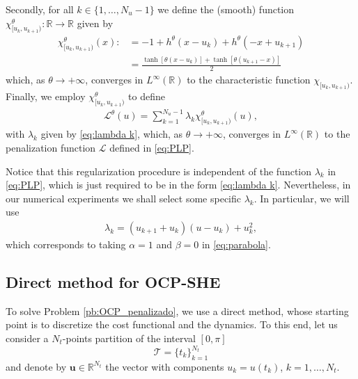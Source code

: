\documentclass[9pt,shortpaper,twoside,web]{ieeecolor}
\begin{document}
Secondly, for all $k \in \{1,\dots,N_u-1\}$ we define the (smooth) function $\chi_{[u_k,u_{k+1})}^\theta:\mathbb{R} \rightarrow \mathbb{R}$ given by
\begin{align*}
	\chi_{[u_k,u_{k+1})}^\theta(x) :&= - 1 + h^\theta(x-u_k) + h^\theta(-x+u_{k+1}) 
	\\[5pt]
	&= \frac{\tanh[\theta(x-u_k)] + \tanh[\theta (u_{k+1}-x)]}{2}
\end{align*}
which, as $\theta\to +\infty$, converges in $L^\infty(\mathbb{R})$ to the characteristic function $\chi_{[u_k,u_{k+1})}$. Finally, we employ $\chi_{[u_k,u_{k+1})}^\theta$ to define
\begin{align}\label{eq:Lsmooth}
	\mathcal{L}^\theta(u) = \sum_{k = 1}^{N_u-1} \lambda_k \chi^\theta_{[u_k,u_{k+1})}(u),
\end{align}
with $\lambda_k$ given by \eqref{eq:lambda k}, which, as $\theta\to +\infty$, converges in $L^\infty(\mathbb{R})$ to the penalization function $\mathcal L$ defined in \eqref{eq:PLP}.

Notice that this regularization procedure is independent of the function $\lambda_k$ in \eqref{eq:PLP}, which is just required to be in the form \eqref{eq:lambda k}. Nevertheless, in our numerical experiments we shall select some specific $\lambda_k$. In particular, we will use 
\begin{gather}
	\lambda_k = (u_{k+1}+u_{k}) (u-u_k) + u_k^2, 
\end{gather}
which corresponds to taking $\alpha=1$ and $\beta=0$ in \eqref{eq:parabola}.


\subsection{Direct method  for OCP-SHE}

To solve Problem \ref{pb:OCP_penalizado}, we use a direct method, whose starting point is to discretize the cost functional and the dynamics. To this end, let us consider a $N_t$-points partition of the interval $[0,\pi]$ 
\begin{displaymath} 
	\mathcal{T} = \{t_k\}_{k=1}^{N_t} 
\end{displaymath}
and denote by $\bm{u} \in \mathbb{R}^{N_t}$ the vector with components $u_k = u(t_k)$, $k=1,\ldots,N_t$.
\end{document}
